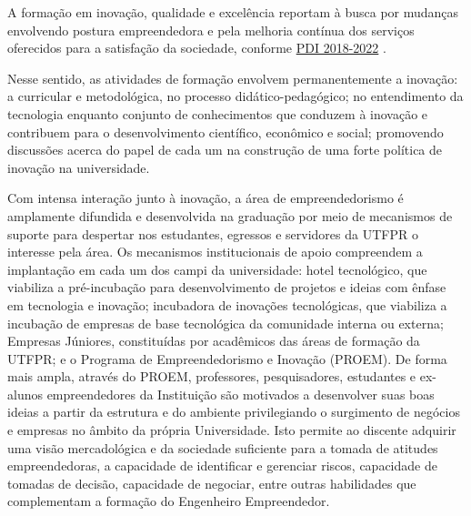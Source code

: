 A formação em inovação, qualidade e excelência reportam à busca por mudanças envolvendo postura empreendedora e pela melhoria contínua dos serviços oferecidos para a satisfação da sociedade, conforme \href{https://cloud.utfpr.edu.br/index.php/s/15P0OcMLMdt9Rv7}{PDI 2018-2022} \cite{pdiutfpr}.

Nesse sentido, as atividades de formação envolvem permanentemente a inovação: a curricular e metodológica, no processo didático-pedagógico; no entendimento da tecnologia enquanto conjunto de conhecimentos que conduzem à inovação e contribuem para o desenvolvimento científico, econômico e social; promovendo discussões acerca do papel de cada um na construção de uma forte política de inovação na universidade.

Com intensa interação junto à inovação, a área de empreendedorismo é amplamente difundida e desenvolvida na graduação por meio de mecanismos de suporte para despertar nos estudantes, egressos e servidores da UTFPR o interesse pela área. Os mecanismos institucionais de apoio compreendem a implantação em cada um dos campi da universidade: hotel tecnológico, que viabiliza a pré-incubação para desenvolvimento de projetos e ideias com ênfase em tecnologia e inovação; incubadora de inovações tecnológicas, que viabiliza a incubação de empresas de base tecnológica da comunidade interna ou externa; Empresas Júniores, constituídas por acadêmicos das áreas de formação da UTFPR; e o Programa de Empreendedorismo e Inovação (PROEM).  De forma mais ampla, através do PROEM, professores, pesquisadores, estudantes e ex-alunos empreendedores da Instituição são motivados a desenvolver suas boas ideias a partir da estrutura e do ambiente privilegiando o surgimento de negócios e empresas no âmbito da própria Universidade.  Isto permite ao discente adquirir uma visão mercadológica e da sociedade suficiente para a tomada de atitudes empreendedoras, a capacidade de identificar e gerenciar riscos, capacidade de tomadas de decisão, capacidade de negociar, entre outras habilidades que complementam a formação do Engenheiro Empreendedor.


